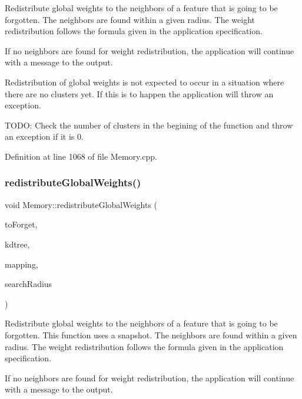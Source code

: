Redistribute global weights to the neighbors of a feature that is going to be forgotten. The neighbors are found within a given radius. The weight redistribution follows the formula given in the application specification.

If no neighbors are found for weight redistribution, the application will continue with a message to the output.

Redistribution of global weights is not expected to occur in a situation where there are no clusters yet. If this is to happen the application will throw an exception.

T\+O\+DO\+: Check the number of clusters in the begining of the function and throw an exception if it is 0. 

Definition at line 1068 of file Memory.\+cpp.

\mbox{\label{class_memory_a3b697274988fa315d03015d854e3f813}} 
\subsubsection{\texorpdfstring{redistribute\+Global\+Weights()}{redistributeGlobalWeights()}\hspace{0.1cm}{\footnotesize\ttfamily [2/2]}}
{\footnotesize\ttfamily void Memory\+::redistribute\+Global\+Weights (\begin{DoxyParamCaption}\item[{unordered\+\_\+set$<$ int $>$ \&}]{to\+Forget,  }\item[{Kd\+Tree\+F\+L\+A\+NN$<$ Histogram$<$ 153 $>$ $>$ \&}]{kdtree,  }\item[{vector$<$ int $>$ \&}]{mapping,  }\item[{double}]{search\+Radius }\end{DoxyParamCaption})\hspace{0.3cm}{\ttfamily [protected]}}

Redistribute global weights to the neighbors of a feature that is going to be forgotten. This function uses a snapshot. The neighbors are found within a given radius. The weight redistribution follows the formula given in the application specification.

If no neighbors are found for weight redistribution, the application will continue with a message to the output.


